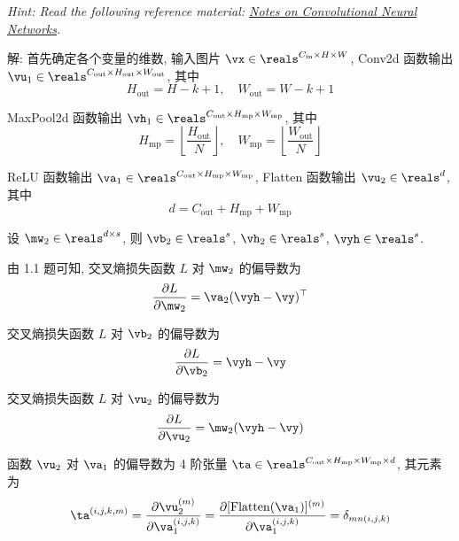 \documentclass[openany]{ctexbook}
\theoremstyle{kaiti}
\theoremstyle{normal}
\begin{document}
\emph{Hint: Read the following reference material: \href{http://cogprints.org/5869/1/cnn_tutorial.pdf}{Notes on Convolutional Neural Networks}.}

解: 首先确定各个变量的维数, 输入图片 $\vx\in\reals^{C_{\text{in}}\times H\times W}$, Conv2d 函数输出 $\vu_1\in\reals^{C_{\text{out}}\times H_{\text{out}}\times W_{\text{out}}}$, 其中
\begin{equation}
  H_{\text{out}}=H-k+1,\quad W_{\text{out}}=W-k+1
\end{equation}

MaxPool2d 函数输出 $\vh_1\in\reals^{C_{\text{out}}\times H_{\text{mp}}\times W_{\text{mp}}}$, 其中
\begin{equation}
  H_{\text{mp}}=\left\lfloor\frac{H_{\text{out}}}{N}\right\rfloor,\quad W_{\text{mp}}=\left\lfloor\frac{W_{\text{out}}}{N}\right\rfloor
\end{equation}

ReLU 函数输出 $\va_1\in\reals^{C_{\text{out}}\times H_{\text{mp}}\times W_{\text{mp}}}$, Flatten 函数输出 $\vu_2\in\reals^{d}$, 其中
\begin{equation}
  d=C_{\text{out}}+H_{\text{mp}}+W_{\text{mp}}
\end{equation}

设 $\mw_2\in\reals^{d\times s}$, 则 $\vb_2\in\reals^{s}$, $\vh_2\in\reals^{s}$, $\vyh\in\reals^{s}$.

由 1.1 题可知, 交叉熵损失函数 $L$ 对 $\mw_2$ 的偏导数为
\begin{equation}
  \frac{\partial L}{\partial \mw_2}=\va_2(\vyh-\vy)^\top
\end{equation}

交叉熵损失函数 $L$ 对 $\vb_2$ 的偏导数为
\begin{equation}
  \frac{\partial L}{\partial \vb_2}=\vyh-\vy
\end{equation}

交叉熵损失函数 $L$ 对 $\vu_2$ 的偏导数为
\begin{equation}
  \frac{\partial L}{\partial \vu_2}=\mw_2(\vyh-\vy)
\end{equation}

函数 $\vu_2$ 对 $\va_1$ 的偏导数为 4 阶张量 $\ta\in\reals^{C_{\text{out}}\times H_{\text{mp}}\times W_{\text{mp}}\times d}$, 其元素为
\begin{equation}
  \ta^{(i,j,k,m)}
  =\frac{\partial\vu_2^{(m)}}{\partial\va_1^{(i,j,k)}}
  =\frac{\partial[\mathrm{Flatten}(\va_1)]^{(m)}}{\partial\va_1^{(i,j,k)}}
  =\delta_{mn(i,j,k)}
\end{equation}
\end{document}

